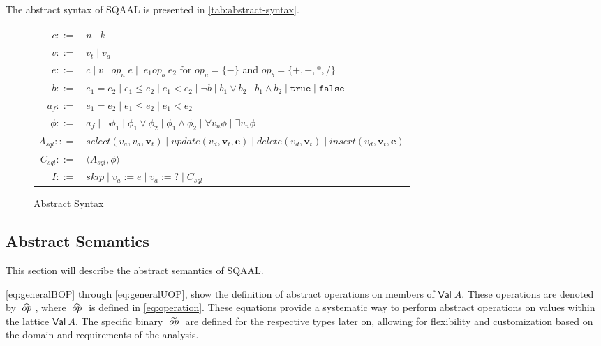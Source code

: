 The abstract syntax of SQAAL is presented in \autoref{tab:abstract-syntax}.
\begin{figure}[htb!]
    \center
    \begin{tabular}{r l}
        $c ::=$ & $n \mid k$ \\
        $v ::=$ & $v_t \mid v_a$ \\
        $e ::=$ & $c \mid v \mid op_u\; e \mid \;e_1 op_b\; e_2$ for $op_u = \{-\}$ and $op_b = \{+, -, *, / \}$ \\

        $b ::=$ & $e_1 = e_2 \mid e_1 \leq e_2 \mid e_1 < e_2 \mid \neg b \mid b_1 \lor b_2 \mid b_1 \land b_2 \mid \texttt{true} \mid \texttt{false}$ \\

        $a_f ::=$ & $e_1 = e_2 \mid e_1 \leq e_2 \mid e_1 < e_2$ \\
        $\phi ::=$ & $a_f \mid \neg \phi_1 \mid \phi_1 \lor \phi_2 \mid \phi_1 \land \phi_2 \mid \forall v_n \phi \mid \exists v_n \phi$ \\
        $A_{sql} :: =$ & $select(v_a, v_d, \mathbf{v}_t) \mid update(v_d, \mathbf{v}_t, \mathbf{e}) \mid delete(v_d, \mathbf{v}_t) \mid insert(v_d, \mathbf{v}_t, \mathbf{e})$ \\
        $C_{sql} ::=$ & $\langle A_{sql}, \phi \rangle $ \\
        $I ::=$ & $skip \mid v_a := e \mid v_a := ? \mid C_{sql} $\\
    \end{tabular}
    \caption{Abstract Syntax}
    \label{tab:abstract-syntax}
\end{figure}

\subsection{Abstract Semantics}\label{subsec:abstract-semantics}
This section will describe the abstract semantics of SQAAL.

\autoref{eq:generalBOP} through \ref{eq:generalUOP}, show the definition of abstract operations on members of $\mathsf{Val} \; A$.
These operations are denoted by $\;\widehat{op}\;$, where $\;\widehat{op}\;$ is defined in \autoref{eq:operation}.
These equations provide a systematic way to perform abstract operations on values within the lattice $\mathsf{Val} \ A$.
The specific binary $\;\widetilde{op}\;$ are defined for the respective types later on, allowing for flexibility and customization based on the domain and requirements of the analysis.


